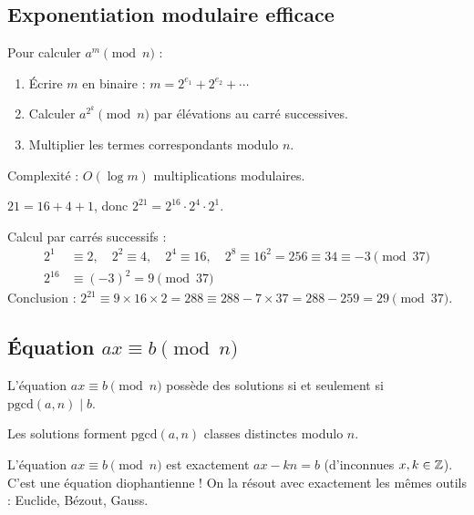 \subsection{Exponentiation modulaire efficace}

\begin{methodbox}
Pour calculer $a^m \pmod{n}$ :
\begin{enumerate}[leftmargin=1.5cm]
  \item Écrire $m$ en binaire : $m = 2^{e_1} + 2^{e_2} + \cdots$
  \item Calculer $a^{2^k} \pmod{n}$ par élévations au carré successives.
  \item Multiplier les termes correspondants modulo $n$.
\end{enumerate}
Complexité : $O(\log m)$ multiplications modulaires.
\end{methodbox}

\begin{exbox}
$21 = 16 + 4 + 1$, donc $2^{21} = 2^{16} \cdot 2^4 \cdot 2^1$.

Calcul par carrés successifs :
\begin{align*}
  2^1 &\equiv 2, \quad 2^2 \equiv 4, \quad 2^4 \equiv 16, \quad 2^8 \equiv 16^2 = 256 \equiv 34 \equiv -3 \pmod{37} \\
  2^{16} &\equiv (-3)^2 = 9 \pmod{37}
\end{align*}
Conclusion : $2^{21} \equiv 9 \times 16 \times 2 = 288 \equiv 288 - 7 \times 37 = 288 - 259 = 29 \pmod{37}$.
\end{exbox}


\subsection{Équation $ax \equiv b \pmod{n}$}

\begin{propbox}[--- Résolution]
L'équation $ax \equiv b \pmod{n}$ possède des solutions si et seulement si $\text{pgcd}(a, n) \mid b$.

Les solutions forment $\text{pgcd}(a, n)$ classes distinctes modulo $n$.
\end{propbox}

\begin{intuitionbox}
L'équation $ax \equiv b \pmod{n}$ est exactement $ax - kn = b$ (d'inconnues $x, k \in \mathbb{Z}$). C'est une équation diophantienne ! On la résout avec exactement les mêmes outils : Euclide, Bézout, Gauss.
\end{intuitionbox}


